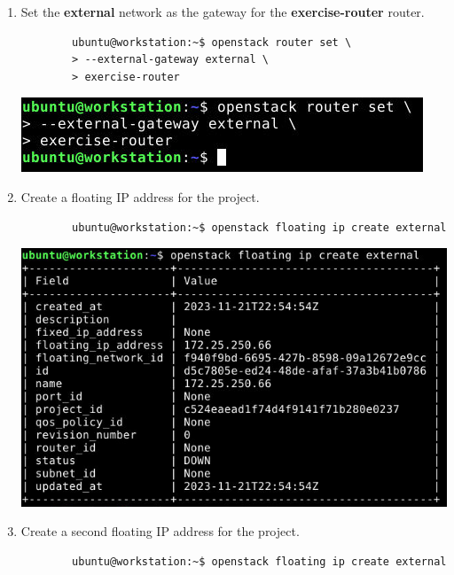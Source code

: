 \documentclass[letterpaper, 12pt]{article}
\begin{document}
\begin{enumerate}
    \item Set the \textbf{external} network as the gateway for the \textbf{exercise-router} router.
    \begin{lstlisting}
        ubuntu@workstation:~$ openstack router set \
        > --external-gateway external \
        > exercise-router
    \end{lstlisting}

    \begin{center}
        \includegraphics[width=\linewidth]{images/part5/step4.png}
    \end{center}

    \item Create a floating IP address for the project.
    \begin{lstlisting}
        ubuntu@workstation:~$ openstack floating ip create external
    \end{lstlisting}

    \begin{center}
        \includegraphics[width=\linewidth]{images/part5/step5.png}
    \end{center}

    \item Create a second floating IP address for the project.
    \begin{lstlisting}
        ubuntu@workstation:~$ openstack floating ip create external
    \end{lstlisting}


\end{enumerate}
\end{document}
